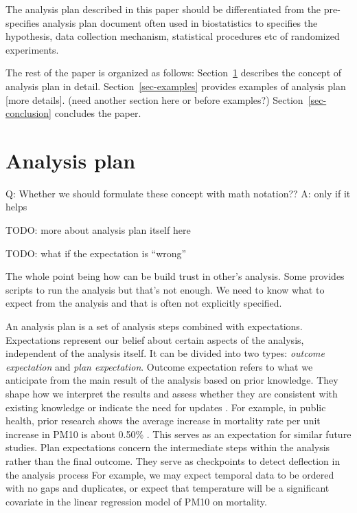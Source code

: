 \documentclass[
]{jds}
\begin{document}
The analysis plan described in this paper should be differentiated from
the pre-specifies analysis plan document often used in biostatistics to
specifies the hypothesis, data collection mechanism, statistical
procedures etc of randomized experiments.

The rest of the paper is organized as follows: Section~\ref{sec-plan}
describes the concept of analysis plan in detail.
Section~\ref{sec-examples} provides examples of analysis plan {[}more
details{]}. (need another section here or before examples?)
Section~\ref{sec-conclusion} concludes the paper.

\section{Analysis plan}\label{sec-plan}

Q: Whether we should formulate these concept with math notation?? A:
only if it helps

TODO: more about analysis plan itself here

TODO: what if the expectation is ``wrong''

The whole point being how can be build trust in other's analysis. Some
provides scripts to run the analysis but that's not enough. We need to
know what to expect from the analysis and that is often not explicitly
specified.

An analysis plan is a set of analysis steps combined with expectations.
Expectations represent our belief about certain aspects of the analysis,
independent of the analysis itself. It can be divided into two types:
\emph{outcome expectation} and \emph{plan expectation}. Outcome
expectation refers to what we anticipate from the main result of the
analysis based on prior knowledge. They shape how we interpret the
results and assess whether they are consistent with existing knowledge
or indicate the need for updates \citep{grolemund_cognitive_2014}. For
example, in public health, prior research shows the average increase in
mortality rate per unit increase in PM10 is about 0.50\%
\citep{liu2019ambient}. This serves as an expectation for similar future
studies. Plan expectations concern the intermediate steps within the
analysis rather than the final outcome. They serve as checkpoints to
detect deflection in the analysis process For example, we may expect
temporal data to be ordered with no gaps and duplicates, or expect that
temperature will be a significant covariate in the linear regression
model of PM10 on mortality.
\end{document}
